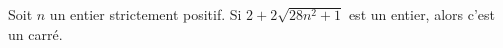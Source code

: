 Soit $n$ un entier strictement positif. Si $2 + 2\sqrt{28n^2 + 1}$ est un entier, alors c'est un carré.
